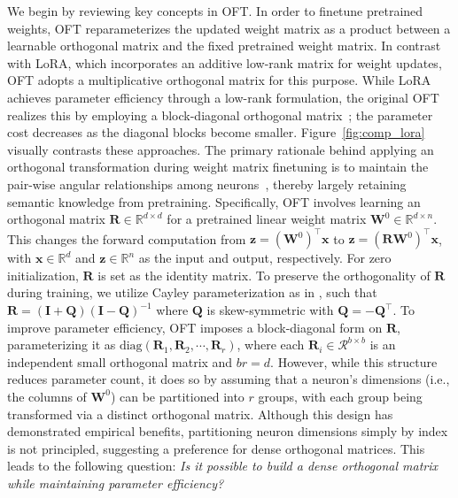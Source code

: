 We begin by reviewing key concepts in OFT. In order to finetune pretrained weights, OFT reparameterizes the updated weight matrix as a product between a learnable orthogonal matrix and the fixed pretrained weight matrix. In contrast with LoRA, which incorporates an additive low-rank matrix for weight updates, OFT adopts a multiplicative orthogonal matrix for this purpose. While LoRA achieves parameter efficiency through a low-rank formulation, the original OFT realizes this by employing a block-diagonal orthogonal matrix~\cite{qiu2023controlling}; the parameter cost decreases as the diagonal blocks become smaller. Figure~\ref{fig:comp_lora} visually contrasts these approaches. The primary rationale behind applying an orthogonal transformation during weight matrix finetuning is to maintain the pair-wise angular relationships among neurons~\cite{liu2018learning,liu2021orthogonal,qiu2023controlling}, thereby largely retaining semantic knowledge from pretraining. Specifically, OFT involves learning an orthogonal matrix $\bm{R}\in\mathbb{R}^{d\times d}$ for a pretrained linear weight matrix $\bm{W}^0\in\mathbb{R}^{d\times n}$. This changes the forward computation from $\bm{z}=(\bm{W}^0)^\top\bm{x}$ to $\bm{z}=(\bm{R}\bm{W}^0)^\top\bm{x}$, with $\bm{x}\in\mathbb{R}^{d}$ and $\bm{z}\in\mathbb{R}^{n}$ as the input and output, respectively. For zero initialization, $\bm{R}$ is set as the identity matrix. To preserve the orthogonality of $\bm{R}$ during training, we utilize Cayley parameterization as in \cite{qiu2023controlling,liu2021orthogonal}, such that $\bm{R}=(\bm{I}+\bm{Q})(\bm{I}-\bm{Q})^{-1}$ where $\bm{Q}$ is skew-symmetric with $\bm{Q}=-\bm{Q}^\top$. To improve parameter efficiency, OFT imposes a block-diagonal form on $\bm{R}$, parameterizing it as $\text{diag}(\bm{R}_1,\bm{R}_2,\cdots,\bm{R}_r)$, where each $\bm{R}_i\in\mathcal{R}^{b\times b}$ is an independent small orthogonal matrix and $br=d$. However, while this structure reduces parameter count, it does so by assuming that a neuron's dimensions (i.e., the columns of $\bm{W}^0$) can be partitioned into $r$ groups, with each group being transformed via a distinct orthogonal matrix. Although this design has demonstrated empirical benefits, partitioning neuron dimensions simply by index is not principled, suggesting a preference for dense orthogonal matrices. This leads to the following question: \emph{Is it possible to build a dense orthogonal matrix while maintaining parameter efficiency?}

